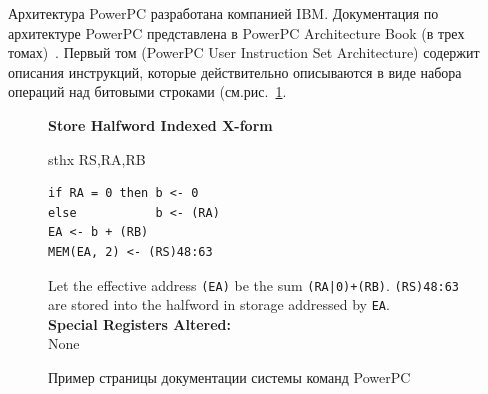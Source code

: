 Архитектура PowerPC разработана компанией IBM. Документация по архитектуре
PowerPC представлена в PowerPC Architecture Book (в трех томах)~\cite{PowerPC}. Первый том (PowerPC User Instruction Set Architecture) содержит описания инструкций, которые действительно описываются в виде набора операций над битовыми строками (см.рис.~\ref{fig:ppc_page}.

\begin{figure}
\textbf{Store Halfword Indexed X-form}

sthx RS,RA,RB

\begin{verbatim}
if RA = 0 then b <- 0
else           b <- (RA)
EA <- b + (RB)
MEM(EA, 2) <- (RS)48:63
\end{verbatim}

Let the effective address \texttt{(EA)} be the sum \texttt{(RA|0)+(RB)}. \texttt{(RS)48:63} are stored into the halfword in storage addressed by \texttt{EA}.\\

\textbf{Special Registers Altered:}\\
None
\caption{Пример страницы документации системы команд PowerPC}\label{fig:ppc_page}
\end{figure}

